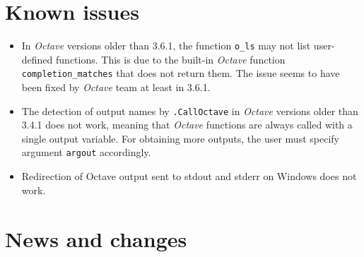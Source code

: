 \documentclass[english,10pt,a4paper]{article}\usepackage[]{graphicx}\usepackage[]{color}
\let\proglang=\textit
\let\code=\texttt
\newcommand{\octave}{\proglang{Octave}\xspace}
\begin{document}
\section{Known issues}
\label{sec:issues}

\begin{itemize}
 \item In \octave versions older than 3.6.1, the function \code{o\_ls} may not
 list user-defined functions. 
 This is due to the built-in \octave function \code{completion\_matches} that
 does not return them. The issue seems to have been fixed by \octave team at
 least in 3.6.1.
 \item The detection of output names by \code{.CallOctave} in \octave versions
 older than 3.4.1 does not work, meaning that \octave functions are always
 called with a single output variable.
 For obtaining more outputs, the user must specify argument \code{argout}
 accordingly.
 \item Redirection of Octave output sent to stdout and stderr on Windows does
 not work.
\end{itemize}

\section{News and changes}
\end{document}
